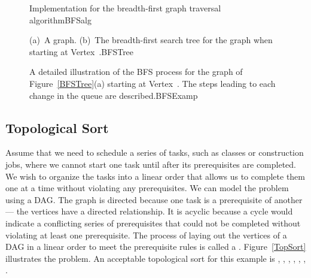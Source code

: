 \begin{figure}
\vspace{-\bigskipamount}
{Implementation for the breadth-first graph traversal algorithm}{BFSalg}
\end{figure}

\begin{figure}

\vspace{-\bigskipamount}

{(a)~A graph.
(b)~The breadth-first search tree for the graph when starting at
Vertex~.}{BFSTree}
\end{figure}

\begin{figure}
{A detailed illustration of the BFS process for the graph of
Figure~\ref{BFSTree}(a) starting at Vertex~.
The steps leading to each change in the queue are described.}{BFSExamp}
\end{figure}
 
\subsection{Topological Sort}

Assume that we need to schedule a series of tasks, such as classes or
construction jobs, where we cannot start one task until after its
prerequisites are completed.
We wish to organize the tasks into a linear order that allows us to
complete them one at a time without violating any prerequisites.
We can model the problem using a
DAG.
The graph is directed because one task is a prerequisite of
another --- the vertices have a directed relationship.
It is acyclic because a cycle would indicate a conflicting series of
prerequisites that could not be completed without violating at least
one prerequisite.
The process of laying out the vertices of a DAG in a linear order to
meet the prerequisite rules is called a .
Figure~\ref{TopSort} illustrates the problem.
An acceptable topological sort for this example is ,
, , , , , .

